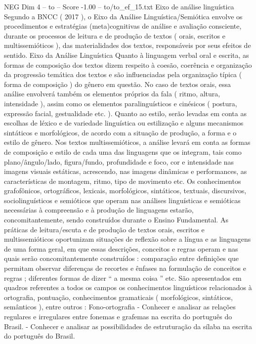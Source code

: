 \begin{textsample}{NEG Dim 4 – to – Score -1.00 – to/to\_ef\_15.txt}  \label{ex:f4_neg_085}
Eixo de análise linguística Segundo a BNCC ( 2017 ), o Eixo da Análise Linguística/Semiótica envolve os procedimentos e estratégias (meta)cognitivas de análise e avaliação consciente, durante os processos de leitura e de produção de textos ( orais, escritos e multissemióticos ), das materialidades dos textos, responsáveis por seus efeitos de sentido.
Eixo da Análise Linguística Quanto à linguagem verbal oral e escrita, as formas de composição dos textos dizem respeito à coesão, coerência e organização da progressão temática dos textos e são influenciadas pela organização típica ( forma de composição ) do gênero em questão.
No caso de textos orais, essa análise envolverá também os elementos próprios da fala ( ritmo, altura, intensidade ), assim como os elementos paralinguísticos e cinésicos ( postura, expressão facial, gestualidade etc. ).
Quanto ao estilo, serão levadas em conta as escolhas de léxico e de variedade linguística ou estilização e alguns mecanismos sintáticos e morfológicos, de acordo com a situação de produção, a forma e o estilo de gênero.
Nos textos multissemióticos, a análise levará em conta as formas de composição e estilo de cada uma das linguagens que os integram, tais como plano/ângulo/lado, figura/fundo, profundidade e foco, cor e intensidade nas imagens visuais estáticas, acrescendo, nas imagens dinâmicas e performances, as características de montagem, ritmo, tipo de movimento etc.
Os conhecimentos grafofônicos, ortográficos, lexicais, morfológicos, sintáticos, textuais, discursivos, sociolinguísticos e semióticos que operam nas análises linguísticas e semióticas necessárias à compreensão e à produção de linguagens estarão, concomitantemente, sendo construídos durante o Ensino Fundamental.
As práticas de leitura/escuta e de produção de textos orais, escritos e multissemióticos oportunizam situações de reflexão sobre a língua e as linguagens de uma forma geral, em que essas descrições, conceitos e regras operam e nas quais serão concomitantemente construídos : comparação entre definições que permitam observar diferenças de recortes e ênfases na formulação de conceitos e regras ; diferentes formas de dizer “ a mesma coisa ” etc.
São apresentados em quadros referentes a todos os campos os conhecimentos linguísticos relacionados à ortografia, pontuação, conhecimentos gramaticais ( morfológicos, sintáticos, semânticos ), entre outros : Fono-ortografia - Conhecer e analisar as relações regulares e irregulares entre fonemas e grafemas na escrita do português do Brasil. - Conhecer e analisar as possibilidades de estruturação da sílaba na escrita do português do Brasil.

\end{textsample}
